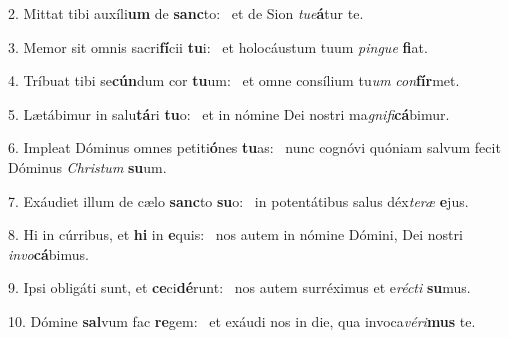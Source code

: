 2. Mittat tibi auxíli\textbf{um} de \textbf{sanc}to: \ast\  et de Sion \textit{tu}\textit{e}\textbf{á}tur te.\

3. Memor sit omnis sacri\textbf{fí}cii \textbf{tu}i: \ast\  et holocáustum tuum \textit{pin}\textit{gue} \textbf{fi}at.\

4. Tríbuat tibi se\textbf{cún}dum cor \textbf{tu}um: \ast\  et omne consílium tu\textit{um} \textit{con}\textbf{fír}met.\

5. Lætábimur in salu\textbf{tá}ri \textbf{tu}o: \ast\  et in nómine Dei nostri ma\textit{gni}\textit{fi}\textbf{cá}bimur.\

6. Impleat Dóminus omnes petiti\textbf{ó}nes \textbf{tu}as: \ast\  nunc cognóvi quóniam salvum fecit Dóminus \textit{Chris}\textit{tum} \textbf{su}um.\

7. Exáudiet illum de cælo \textbf{sanc}to \textbf{su}o: \ast\  in potentátibus salus déx\textit{te}\textit{ræ} \textbf{e}jus.\

8. Hi in cúrribus, et \textbf{hi} in \textbf{e}quis: \ast\  nos autem in nómine Dómini, Dei nostri \textit{in}\textit{vo}\textbf{cá}bimus.\

9. Ipsi obligáti sunt, et \textbf{ce}ci\textbf{dé}runt: \ast\  nos autem surréximus et e\textit{réc}\textit{ti} \textbf{su}mus.\

10. Dómine \textbf{sal}vum fac \textbf{re}gem: \ast\  et exáudi nos in die, qua invoca\textit{vé}\textit{ri}\textbf{mus} te.\

